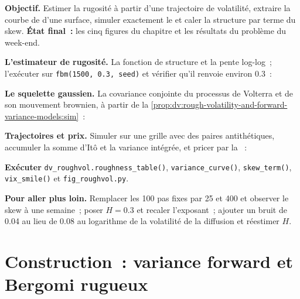 \begin{tutorial}
\textbf{Objectif.} Estimer la rugosité à partir d'une trajectoire de volatilité, extraire la courbe de  d'une surface,
simuler exactement le  et caler la structure par terme du skew. \textbf{État final~:} les cinq figures du
chapitre et les résultats du problème du week-end.
\begin{tutsteps}
\item \textbf{L'estimateur de rugosité.} La fonction de structure et la pente log-log~; l'exécuter sur
\texttt{fbm(1500, 0.3, seed)} et vérifier qu'il renvoie environ 0.3~:
\label{lst:dv:rough-volatility-and-forward-variance-models:rough}
\item \textbf{Le squelette gaussien.} La covariance conjointe du processus de Volterra et de son mouvement brownien,
à partir de la \cref{prop:dv:rough-volatility-and-forward-variance-models:sim}~:
\label{lst:dv:rough-volatility-and-forward-variance-models:cov}
\item \textbf{Trajectoires et prix.} Simuler sur une grille avec des paires antithétiques, accumuler la somme d'Itô et la
variance intégrée, et pricer par la ~:
\label{lst:dv:rough-volatility-and-forward-variance-models:rbergomi}
\item \textbf{Exécuter} \texttt{dv\_roughvol.roughness\_table()}, \texttt{variance\_curve()}, \texttt{skew\_term()},
\texttt{vix\_smile()} et \texttt{fig\_roughvol.py}.
\end{tutsteps}
\textbf{Pour aller plus loin.} Remplacer les 100 pas fixes par 25 et 400 et observer le skew à une semaine~; poser $H=0.3$ et
recaler l'exposant~; ajouter un bruit de 0.04 au lieu de 0.08 au logarithme de la volatilité de la diffusion et réestimer $H$.
\end{tutorial}

\section{Construction~: variance forward et Bergomi rugueux}\label{bld:dv:rough-volatility-and-forward-variance-models:fwdvar}

